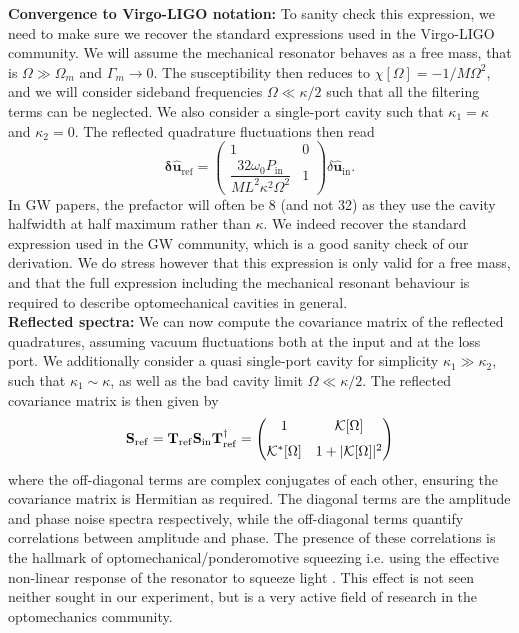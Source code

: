 \noindent \textbf{Convergence to Virgo-LIGO notation:} To sanity check this expression, we need to make sure we recover the standard expressions used in the Virgo-LIGO community. We will assume the mechanical resonator behaves as a free mass, that is $\Omega \gg \Omega_m$ and $\Gamma_m \rightarrow 0$. The susceptibility then reduces to $\chi[\Omega] = -1/ M \Omega^2$, and we will consider sideband frequencies $\Omega \ll \kappa/2$ such that all the filtering terms can be neglected. We also consider a single-port cavity such that $\kappa_1 = \kappa$ and $\kappa_2=0$. The reflected quadrature fluctuations then read
\begin{equation}
\mathbf{\delta \hat{u}_{\mathrm{ref}}}
=
\begin{pmatrix}
  1   & 0 \\[12pt]
  \dfrac{32 \omega_0P_{\mathrm{in}}}{M L^2\kappa^2 \Omega^2}    &  1
\end{pmatrix}
\delta\hat{\mathbf u}_{\mathrm{in}}.
\end{equation}
In GW papers, the prefactor will often be 8 (and not 32) as they use the cavity halfwidth at half maximum rather than $\kappa$. We indeed recover the standard expression used in the GW community, which is a good sanity check of our derivation. We do stress however that this expression is only valid for a free mass, and that the full expression including the mechanical resonant behaviour is required to describe optomechanical cavities in general. \\


\noindent \textbf{Reflected spectra:} We can now compute the covariance matrix of the reflected quadratures, assuming vacuum fluctuations both at the input and at the loss port. We additionally consider a quasi single-port cavity for simplicity $\kappa_1 \gg \kappa_2$, such that $\kappa_1\sim\kappa$, as well as the bad cavity limit $\Omega \ll \kappa/2$. The reflected covariance matrix is then given by
\begin{equation}
      \mathbf{S}_{\rm ref} =\mathbf{T}_{\mathrm{ref}} \mathbf{S}_{\text{in}} \mathbf{T}_{\mathrm{ref}}^{\dagger}  = \begin{pmatrix}
        1 &  \mathcal{K}[\Omega]\\[6pt]
          \mathcal{K}^{*}[\Omega]& 1 +  |\mathcal{K}[\Omega]|^2
      \end{pmatrix}
\end{equation}
where the off-diagonal terms are complex conjugates of each other, ensuring the covariance matrix is Hermitian as required. The diagonal terms are the amplitude and phase noise spectra respectively, while the off-diagonal terms quantify correlations between amplitude and phase. The presence of these correlations is the hallmark of optomechanical/ponderomotive squeezing i.e. using the effective non-linear response of the resonator to squeeze light \cite{Aggarwal2020}. This effect is not seen neither sought in our experiment, but is a very active field of research in the optomechanics community. \\

